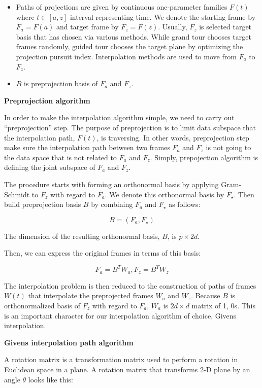 \begin{itemize}
\item
  Paths of projections are given by continuous one-parameter families \(F(t)\) where \(t\in [a, z]\) interval representing time. We denote the starting frame by \(F_a = F(a)\) and target frame by \(F_z = F(z)\). Usually, \(F_z\) is selected target basis that has chosen via various methods. While grand tour chooses target frames randomly, guided tour chooses the target plane by optimizing the projection pursuit index. Interpolation methods are used to move from \(F_a\) to \(F_z\).
\item
  \(B\) is preprojection basis of \(F_a\) and \(F_z\).
\end{itemize}

\textbf{Preprojection algorithm}

In order to make the interpolation algorithm simple, we need to carry out ``preprojection'' step.
The purpose of preprojection is to limit data subspace that the interpolation path, \(F(t)\), is traversing. In other words, preprojection step make sure the interpolation path between two frames \(F_a\) and \(F_z\) is not going to the data space that is not related to \(F_a\) and \(F_z\). Simply, prepojection algorithm is defining the joint subspace of \(F_a\) and \(F_z\).

The procedure starts with forming an orthonormal basis by applying Gram-Schmidt to \(F_z\) with regard to \(F_a\). We denote this orthonormal basis by \(F_\star\). Then build preprojection basis \(B\) by combining \(F_a\) and \(F_\star\) as follows:

\[B = (F_a, F_{\star})\]

The dimension of the resulting orthonormal basis, \(B\), is \(p\times 2d\).

Then, we can express the original frames in terms of this basis:

\[F_a = B^TW_a, F_z = B^TW_z\]

The interpolation problem is then reduced to the construction of paths of frames \(W(t)\) that interpolate the preprojected frames \(W_a\) and \(W_z\). Because \(B\) is orthonormalized basis of \(F_z\) with regard to \(F_a\), \(W_a\) is \(2d\times d\) matrix of 1, 0s. This is an important character for our interpolation algorithm of choice, Givens interpolation.

\textbf{Givens interpolation path algorithm}

A rotation matrix is a transformation matrix used to perform a rotation in Euclidean space in a plane. A rotation matrix that transforms 2-D plane by an angle \(\theta\) looks like this:

